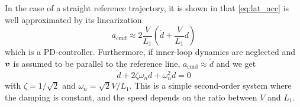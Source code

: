 In the case of a straight reference trajectory, it is shown in \cite{l1_controller} that \eqref{eq:lat_acc} 
is well approximated by its linearization
\begin{equation}
    a_{\text{cmd}}\approx2\frac{V}{L_1}\left(\dot{d}+\frac{V}{L_1}d\right)
\end{equation} 
which is a PD-controller. Furthermore, if inner-loop dynamics are neglected and 
$\boldsymbol{v}$ is assumed to be parallel to the reference line, $a_{\text{cmd}}\approx \ddot{d}$ and we get
\begin{equation}
    \ddot{d} + 2\zeta\omega_n\dot{d} + \omega_n^2d=0
\end{equation}
with $\zeta=1/\sqrt{2}$ and $\omega_n=\sqrt{2}V/L_1$. This is a simple second-order system where 
the damping is constant, and the speed depends on the ratio between $V$ and $L_1$. 
\iffalse
\subsection{Altitude and velocity control loop}
ArduPlane uses a combined control loop to handle both desired altitude and velocity, called 
TECS (Total Energy Control System). This controller is based on the total energy of the \ac{uav},
which is defined as
\begin{equation}
    E_T=\frac{1}{2}mV^2 + mgh
\end{equation}
where $h$ is the altitude relative to the takeoff point. The total energy rate is derived
by taking the derivative with respect to time as
\begin{equation}
    \dot{E}_T=mV\dot{V} + mg\dot{h}
\end{equation}
The specific energy rate is then
\begin{equation}
    \dot{E}_S = \frac{\dot{E}_T}{mgV} = \frac{\dot{V}}{g} + \frac{\dot{h}}{V} = \frac{\dot{V}}{g} + \sin\gamma
\end{equation}
If $\gamma$ is small, we get
\begin{equation}
    \dot{E}_S\approx\frac{\dot{V}}{g} + \gamma
\end{equation} 
The longitudinal aircraft dynamics give
\begin{equation}
    T-D=\frac{\dot{V}}{g} + \gamma
\end{equation}
Thus, by increasing the thrust
energy is added to the system. By changing the pitch angle using the elevators, the balance 
between kinetic and potential energy can be modified. 
\fi

